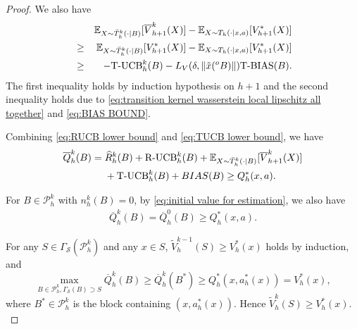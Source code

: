 \documentclass[10pt,a4paper]{amsart}
\begin{document}
\begin{proof}
We also have 
    \begin{eqnarray}\label{eq:TUCB lower bound}
     &&   \mathbb{E}_{X \sim \bar{T}_{h}^{k}(\cdot|B)}[\overline{V}_{h+1}^k(X)]- \mathbb{E}_{X \sim {T}_{h}(\cdot|x,a)}[V_{h+1}^{*}(X)]\nonumber\\
         &\geq& \mathbb{E}_{X \sim \bar{T}_{h}^{k}(\cdot|B)}[V_{h+1}^{*}(X)]- \mathbb{E}_{X \sim {T}_{h}(\cdot|x,a)}[V_{h+1}^{*}(X)]\nonumber\\
         &\geq& -\mbox{\rm T-UCB}_{h}^{k}(B)-L_{V}(\delta, \|\tilde{x}(^{o}B)\|)\mbox{\rm T-BIAS}(B). 
    \end{eqnarray}
The first inequality holds by induction hypothesis on $h+1$ and the second inequality holds due to \eqref{eq:transition kernel wasserstein local lipschitz all together} and \eqref{eq:BIAS BOUND}. 

Combining \eqref{eq:RUCB lower bound} and \eqref{eq:TUCB lower bound},  we have
  \begin{align*}
  \overline{Q}_{h}^{k}(B)
  ={}&\widehat{R}_{h}^{k}(B)+\mbox{\rm R-UCB}_{h}^{k}(B)
  +\mathbb{E}_{X \sim \bar{T}_{h}^{k}(\cdot|B)}[\overline{V}_{h+1}^{k}(X)]\\
  &+\mbox{\rm T-UCB}_{h}^{k}(B)+{\rm BIAS}(B)
  \geq Q_{h}^{*}(x,a).
  \end{align*}

For $B\in \mathcal{P}_h^k$ with $n_h^k(B)=0$, by \eqref{eq:initial value for estimation}, we also have
    \begin{eqnarray}
                  \overline{Q}_{h}^{k}(B)=\overline{Q}_{h}^{0}(B)\geq Q_{h}^{*}(x,a).
    \end{eqnarray}


   For any $S \in \Gamma_{\mathcal{S}}(\mathcal{P}_h^k)$ and any $x\in S$, 
   $\widetilde{V}_{h}^{k-1}(S)\ge V^*_h(x)$ holds by induction, and 
           $$\max_{B \in \mathcal{P}_h^k,\Gamma_{\mathcal{S}}(B) \supset S}\overline{Q}_{h}^{k}(B)\geq\overline{Q}_{h}^{k}(B^{*})\geq  Q_{h}^{*}(x,a_{h}^{*}(x))=V_{h}^{*}(x),$$
where $B^{*} \in \mathcal{P}_h^k$ is the block containing $(x,a_{h}^{*}(x))$. 
Hence $\widetilde{V}_{h}^{k}(S)\ge V^*_h(x).$


\end{proof}
\end{document}
